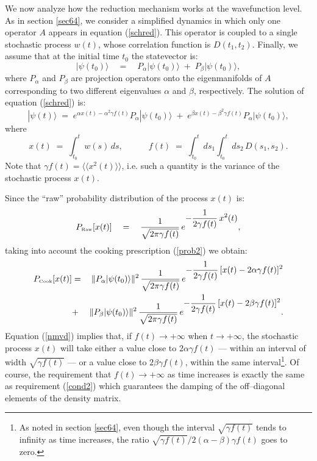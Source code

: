 \documentclass[12pt]{article}
\newcommand{\llangle}{\langle\!\langle}
\newcommand{\rrangle}{\rangle\!\rangle}
\begin{document}
We now analyze how the reduction mechanism works at the
wavefunction level. As in section \ref{sec64}, we consider a
simplified dynamics in which only one operator $A$ appears in
equation (\ref{schred}). This operator is coupled to a single
stochastic process $w(t)$, whose correlation function is $D(t_{1},
t_{2})$. Finally, we assume that at the initial time $t_{0}$ the
statevector is:
\begin{equation}
|\psi(t_{0})\rangle \quad = \quad P_{\alpha} |\psi(t_{0})\rangle
\; + \; P_{\beta} |\psi(t_{0})\rangle,
\end{equation}
where $P_{\alpha}$ and $P_{\beta}$ are projection operators onto
the eigenmanifolds of $A$ corresponding to two different
eigenvalues $\alpha$ and $\beta$, respectively. The solution of
equation (\ref{schred}) is:
\begin{equation}
|\psi(t)\rangle \; = \; e^{\displaystyle \alpha x(t) - \alpha^{2}
\gamma f(t)}P_{\alpha} |\psi(t_{0})\rangle \; + \;
e^{\displaystyle \beta x(t) - \beta^{2} \gamma f(t)}P_{\alpha}
|\psi(t_{0})\rangle,
\end{equation}
where
\begin{equation}
x(t) \; = \; \int_{t_{0}}^{t} w(s)\, ds, \qquad\quad f(t) \; = \;
\int_{t_{0}}^{t} ds_{1} \int_{t_{0}}^{t} ds_{2}\, D(s_{1}, s_{2}).
\end{equation}
Note that $\gamma f(t) = \llangle x^{2}(t) \rrangle$, i.e. such a
quantity is the variance of the stochastic process $x(t)$.

Since the ``raw'' probability distribution of the process $x(t)$
is:
\begin{equation}
P_{\makebox{\tiny Raw}}[x(t)] \quad  = \quad \frac{1}{\sqrt{2\pi
\gamma f(t)}}\, e^{\displaystyle -\frac{1}{2\gamma f(t)}\,
x^{2}(t)},
\end{equation}
taking into account the cooking prescription (\ref{prob2}) we
obtain:
\begin{eqnarray} \label{nmvd}
P_{\makebox{\tiny Cook}}[x(t)] &  = & \|P_{\alpha}
|\psi(t_{0})\rangle \|^{2}\, \frac{1}{\sqrt{2\pi\gamma f(t)}}\,
e^{\displaystyle -\frac{1}{2\gamma f(t)}\, [x(t) - 2\alpha\gamma
f(t)]^{2}} \nonumber \\
&  + & \|P_{\beta} |\psi(t_{0})\rangle \|^{2}\,
\frac{1}{\sqrt{2\pi\gamma f(t)}}\, e^{\displaystyle
-\frac{1}{2\gamma
f(t)}\, [x(t) - 2\beta\gamma f(t)]^{2}}. \nonumber \\
\end{eqnarray}
Equation (\ref{nmvd}) implies that, if $f(t) \rightarrow +\infty$
when $t \rightarrow +\infty$, the stochastic process $x(t)$ will
take either a value close to $2\alpha\gamma f(t)$ --- within an
interval of width $\sqrt{\gamma f(t)}$ --- or a value close to
$2\beta\gamma f(t)$, within the same interval\footnote{As noted in
section \ref{sec64}, even though the interval $\sqrt{\gamma f(t)}$
tends to infinity as time increases, the ratio $\sqrt{\gamma
f(t)}/ 2(\alpha - \beta)\gamma f(t)$ goes to zero.}. Of course,
the requirement that $f(t) \rightarrow +\infty$ as time increases
is exactly the same as requirement (\ref{cond2}) which guarantees
the damping of the off--diagonal elements of the density matrix.
\end{document}
